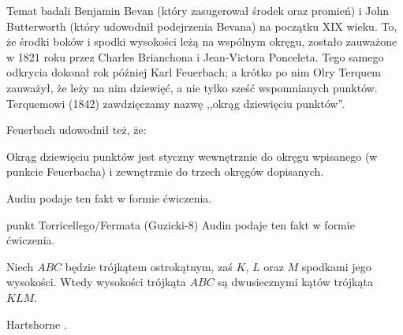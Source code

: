 Temat badali Benjamin Bevan (który zasugerował środek oraz promień) i John Butterworth (który udowodnił podejrzenia Bevana) na początku XIX wieku.
%
%
To, że środki boków i spodki wysokości leżą na wspólnym okręgu, zostało zauważone w 1821 roku przez Charles Brianchona i Jean-Victora Ponceleta.
%
%
Tego samego odkrycia dokonał rok później Karl Feuerbach; a krótko po nim Olry Terquem zauważył, że leży na nim dziewięć, a nie tylko sześć wspomnianych punktów.
%
%
Terquemowi (1842) zawdzięczamy nazwę ,,okrąg dziewięciu punktów''.

Feuerbach udowodnił też, że:

\begin{theorem}[Feuerbacha]
	Okrąg dziewięciu punktów jest styczny wewnętrznie do okręgu wpisanego (w punkcie Feuerbacha) i zewnętrznie do trzech okręgów dopisanych.
\end{theorem}

Audin \cite[s. 110]{audin_2003} podaje ten fakt w formie ćwiczenia.

punkt Torricellego/Fermata (Guzicki-8)
Audin \cite[s. 105]{audin_2003} podaje ten fakt w formie ćwiczenia.

\begin{proposition}
	\label{orthic_triangle}
	Niech $ABC$ będzie trójkątem ostrokątnym, zaś $K$, $L$ oraz $M$ spodkami jego wysokości.
	Wtedy wysokości trójkąta $ABC$ są dwusiecznymi kątów trójkąta $KLM$.
\end{proposition}

Hartshorne \cite[s. 58]{hartshorne2000}.

%
